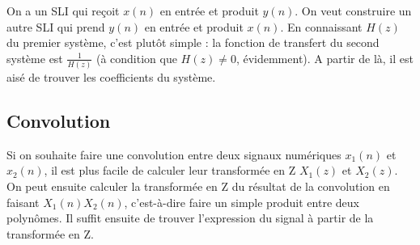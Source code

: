             On a un SLI qui reçoit $x(n)$ en entrée et produit $y(n)$. On veut construire un autre SLI qui prend $y(n)$ en entrée et produit $x(n)$. En connaissant $H(z)$ du premier système, c'est plutôt simple : la fonction de transfert du second système est $\frac{1}{H(z)}$ (à condition que $H(z) \not=0$, évidemment). A partir de là, il est aisé de trouver les coefficients du système.

        \subsection{Convolution}
            Si on souhaite faire une convolution entre deux signaux numériques $x_1(n)$ et $x_2(n)$, il est plus facile de calculer leur transformée en Z $X_1(z)$ et $X_2(z)$. On peut ensuite calculer la transformée en Z du résultat de la convolution en faisant $X_1(n) X_2(n)$, c'est-à-dire faire un simple produit entre deux polynômes. Il suffit ensuite de trouver l'expression du signal à partir de la transformée en Z.